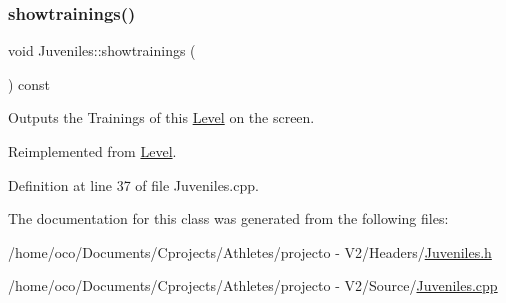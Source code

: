 \subsubsection{\texorpdfstring{showtrainings()}{showtrainings()}}
{\footnotesize\ttfamily void Juveniles\+::showtrainings (\begin{DoxyParamCaption}{ }\end{DoxyParamCaption}) const\hspace{0.3cm}{\ttfamily [virtual]}}



Outputs the Trainings of this \hyperlink{class_level}{Level} on the screen. 



Reimplemented from \hyperlink{class_level_a4101cb725b1fd0c0836834c92b190363}{Level}.



Definition at line 37 of file Juveniles.\+cpp.



The documentation for this class was generated from the following files\+:\begin{DoxyCompactItemize}
\item 
/home/oco/\+Documents/\+Cprojects/\+Athletes/projecto -\/ V2/\+Headers/\hyperlink{_juveniles_8h}{Juveniles.\+h}\item 
/home/oco/\+Documents/\+Cprojects/\+Athletes/projecto -\/ V2/\+Source/\hyperlink{_juveniles_8cpp}{Juveniles.\+cpp}\end{DoxyCompactItemize}
